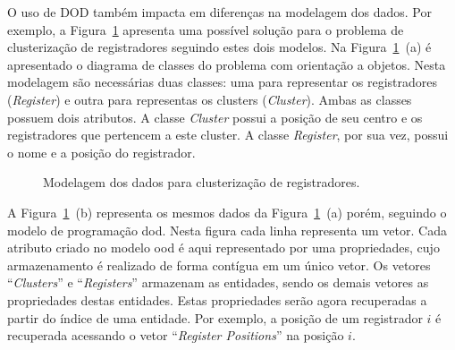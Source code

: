 O uso de DOD também impacta em diferenças na modelagem dos dados. Por exemplo, a Figura~\ref{fig:modelo_register_clustering} apresenta uma possível solução para o problema de clusterização de registradores seguindo estes dois modelos.
Na Figura~\ref{fig:modelo_register_clustering}~(a) é apresentado o diagrama de classes do problema com orientação a objetos. Nesta modelagem são necessárias duas classes: uma para representar os registradores (\textit{Register}) e outra para representas os clusters (\textit{Cluster}). Ambas as classes possuem dois atributos. A classe \textit{Cluster} possui a posição de seu centro e os registradores que pertencem a este cluster. A classe \textit{Register}, por sua vez, possui o nome e a posição do registrador.

\begin{figure}[hb]
    \centering
    \caption{Modelagem dos dados para clusterização de registradores.}
    \label{fig:modelo_register_clustering}
\end{figure}


A Figura~\ref{fig:modelo_register_clustering}~(b) representa os mesmos dados da Figura~\ref{fig:modelo_register_clustering}~(a) porém, seguindo o modelo de programação \ac{dod}.
Nesta figura cada linha representa um vetor.
Cada atributo criado no modelo \ac{ood} é aqui representado por uma propriedades, cujo armazenamento é realizado de forma contígua em um único vetor.
Os vetores ``\textit{Clusters}'' e ``\textit{Registers}'' armazenam as entidades, sendo os demais vetores as propriedades destas entidades.
Estas propriedades serão agora recuperadas a partir do índice de uma entidade.
Por exemplo, a posição de um registrador $i$ é recuperada acessando o vetor ``\textit{Register Positions}'' na posição $i$.

